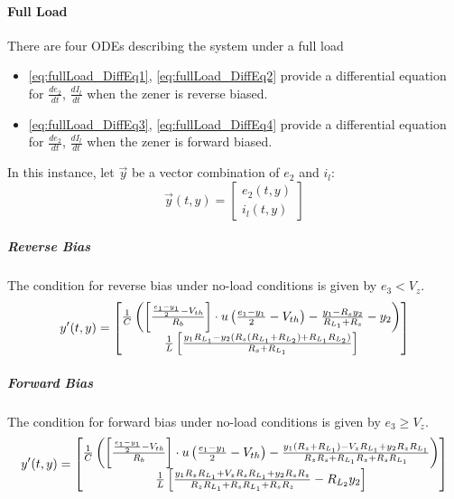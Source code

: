 \paragraph{Full Load}
There are four ODEs describing the system under a full load
\begin{itemize}
	\item \eqref{eq:fullLoad_DiffEq1}, \eqref{eq:fullLoad_DiffEq2} provide a differential equation for $\frac{de_2}{dt}$, $\frac{dI_l}{dt}$ when the zener is reverse biased.
	\item \eqref{eq:fullLoad_DiffEq3}, \eqref{eq:fullLoad_DiffEq4} provide a differential equation for $\frac{de_2}{dt}$, $\frac{dI_l}{dt}$ when the zener is forward biased.
\end{itemize}
In this instance, let $\vec{y}$ be a vector combination of $e_2$ and $i_l$:
\begin{equation}
	\vec{y}(t,y) = \begin{bmatrix}
		e_2(t,y) \\
		i_l(t,y)
	\end{bmatrix}
\end{equation}
\subparagraph{Reverse Bias}
The condition for reverse bias under no-load conditions is given by $e_3 < V_z$.
\begin{equation}
	y'(t,y) = \begin{bmatrix}
		 \frac{1}{C}\left(\left[\frac{\frac{e_1 - y_1}{2} - V_{th}}{R_b} \right]\cdot u\left(\frac{e_1 - y_1}{2} - V_{th} \right) - \frac{y_1 - R_s y_2}{R_{L_1} + R_s} - y_2 \right) \\
		 \frac{1}{L} \left[\frac{y_1R_{L_1} - y_2(R_s(R_{L_1}+R_{L_2}) + R_{L_1}R_{L_2})}{R_s + R_{L_1}} \right]
	\end{bmatrix}
\end{equation}
\subparagraph{Forward Bias}
The condition for forward bias under no-load conditions is given by $e_3 \geq V_z$.  
\begin{equation}
	y'(t,y) = \begin{bmatrix}
		 \frac{1}{C}\left(\left[\frac{\frac{e_1 - y_1}{2} - V_{th}}{R_b} \right]\cdot u\left(\frac{e_1 - y_1}{2} - V_{th} \right) - \frac{y_1 (R_z + R_{L_1}) - V_z R_{L_1} + y_2 R_z R_{L_1}}{R_z R_s + R_{L_1} R_z + R_s R_{L_1}} \right) \\
		 \frac{1}{L} \left[\frac{y_1 R_z R_{L_1} + V_z R_s R_{L_1} + y_2 R_s R_z}{R_z R_{L_1} + R_s R_{L_1} + R_s R_z} - R_{L_2}y_2 \right]
	\end{bmatrix}
\end{equation}